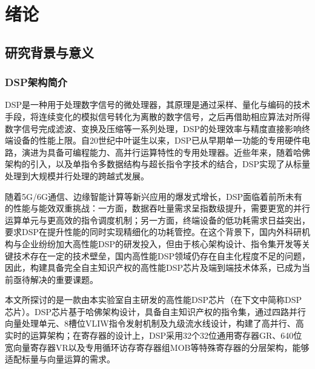 \chapter{绪论}


\section{研究背景与意义}


\subsection{DSP架构简介}
DSP是一种用于处理数字信号的微处理器，其原理是通过采样、量化与编码的技术手段，将连续变化的模拟信号转化为离散的数字信号，之后再借助相应算法对所得数字信号完成滤波、变换及压缩等一系列处理\cite{proakis2007digital}，DSP的处理效率与精度直接影响终端设备的性能上限。自20世纪中叶诞生以来，DSP已从早期单一功能的专用硬件电路，演进为具备可编程能力、高并行运算特性的专用处理器\cite{wang2021advancing}。近些年来，随着哈佛架构的引入\cite{song2023overview}，以及单指令多数据结构\cite{flynn2009some}与超长指令字技术\cite{fisher1998very, rau2011instruction}的结合，DSP实现了从标量处理到大规模并行处理的跨越式发展。

\par

随着5G/6G通信\cite{giordani2020toward}、边缘智能计算\cite{satyanarayanan2009case}等新兴应用的爆发式增长，DSP面临着前所未有的性能与能效双重挑战：一方面，数据吞吐量需求呈指数级提升，需要更宽的并行运算单元与更高效的指令调度机制；另一方面，终端设备的低功耗需求日益突出，要求DSP在提升性能的同时实现精细化的功耗管控。在这个背景下，国内外科研机构与企业纷纷加大高性能DSP的研发投入，但由于核心架构设计、指令集开发等关键技术存在一定的技术壁垒，国内高性能DSP领域仍存在自主化程度不足的问题，因此，构建具备完全自主知识产权的高性能DSP芯片及端到端技术体系，已成为当前亟待解决的重要课题。

\par

本文所探讨的是一款由本实验室自主研发的高性能DSP芯片（在下文中简称DSP芯片）。DSP芯片基于哈佛架构设计，具备自主知识产权的指令集，通过四路并行向量处理单元、8槽位VLIW指令发射机制及九级流水线设计，构建了高并行、高实时的运算架构；在寄存器的设计上，DSP采用32个32位通用寄存器GR、640位宽向量寄存器VR以及专用循环访存寄存器组MOB等特殊寄存器的分层架构，能够适配标量与向量运算的需求。


